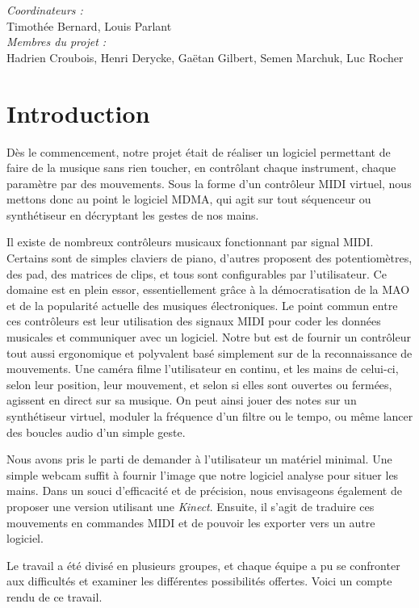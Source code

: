


\maketitle

\begin{center}
	\emph{Coordinateurs :}\\
	Timothée Bernard, Louis Parlant\bigskip\\
	\emph{Membres du projet :}\\
	Hadrien Croubois, Henri Derycke, Gaëtan Gilbert, Semen Marchuk, Luc Rocher
\end{center}

\newpage

\tableofcontents
\newpage
\section{Introduction}
\par Dès le commencement, notre projet était de réaliser un logiciel permettant de faire de la musique sans rien toucher, en contrôlant chaque instrument, chaque paramètre par des mouvements. Sous la forme d'un contrôleur MIDI virtuel, nous mettons donc au point le logiciel MDMA, qui agit sur tout séquenceur ou synthétiseur en décryptant les gestes de nos mains.
\par Il existe de nombreux contrôleurs musicaux fonctionnant par signal MIDI. Certains sont de simples claviers de piano, d'autres proposent des potentiomètres, des pad, des matrices de clips, et tous sont configurables par l'utilisateur. Ce domaine est en plein essor, essentiellement grâce à la démocratisation de la MAO et de la popularité actuelle des musiques électroniques. Le point commun entre ces contrôleurs est leur utilisation des signaux MIDI pour coder les données musicales et communiquer avec un logiciel. Notre but est de fournir un contrôleur tout aussi ergonomique et polyvalent basé simplement sur de la reconnaissance de mouvements. Une caméra filme l'utilisateur en continu, et les mains de celui-ci, selon leur position, leur mouvement, et selon si elles sont ouvertes ou fermées, agissent en direct sur sa musique. On peut ainsi jouer des notes sur un synthétiseur virtuel, moduler la fréquence d'un filtre ou le tempo, ou même lancer des boucles audio d'un simple geste. 
\par Nous avons pris le parti de demander à l'utilisateur un matériel minimal. Une simple webcam suffit à fournir l'image que notre logiciel analyse pour situer les mains. Dans un souci d'efficacité et de précision, nous envisageons également de proposer une version utilisant une \emph{Kinect}. Ensuite, il s'agit de traduire ces mouvements en commandes MIDI et de pouvoir les exporter vers un autre logiciel.
\par Le travail a été divisé en plusieurs groupes, et chaque équipe a pu se confronter aux difficultés et examiner les différentes possibilités offertes. Voici un compte rendu de ce travail.



